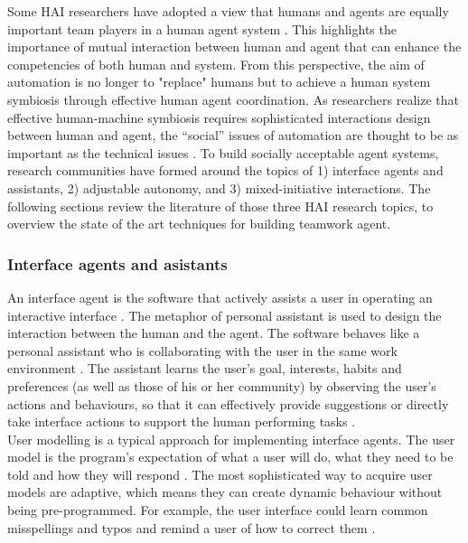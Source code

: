 Some \ac{HAI} researchers have adopted a view that humans and agents are equally important team players in a human agent system \citep{Sukthankara}. This highlights the importance of mutual interaction between human and agent that can enhance the competencies of both human and system. From this perspective, the aim of automation is no longer to "replace" humans but to achieve a human system symbiosis through effective human agent coordination. As researchers realize that effective human-machine symbiosis requires sophisticated interactions design between human and agent, the ``social'' issues of automation are thought to be as important as the technical issues \citep{Bradshaw2011}. To build socially acceptable agent systems, research communities have formed around the topics of 1) interface agents and assistants, 2) adjustable autonomy, and 3) mixed-initiative interactions. The following sections review the literature of those three \ac{HAI} research topics, to overview the state of the art techniques for building teamwork agent. 

\subsubsection{Interface agents and asistants}\label{sec:lrinterfaceagent}
An interface agent is the software that actively assists a user in operating an interactive interface \citep{Lieberman2003}. The metaphor of personal assistant is used to design the interaction between the human and the agent. The software behaves like a personal assistant who is collaborating with the user in the same work environment \citep{Lieberman1997}. The assistant learns the user's goal, interests, habits and preferences (as well as those of his or her community) by observing the user's actions and behaviours,  so that it can effectively provide suggestions or directly take interface actions to support the human performing tasks \citep{Maes1994}.\\

User modelling is a typical approach for implementing interface agents. The user model is the program's expectation of what a user will do, what they need to be told and how they will respond \citep{Lieberman2003}.  The most sophisticated way to acquire user models are adaptive, which means they can create dynamic behaviour without being pre-programmed. For example, the user interface could learn common misspellings and typos and remind a user of how to correct them \citep{Lieberman2003}.\\

